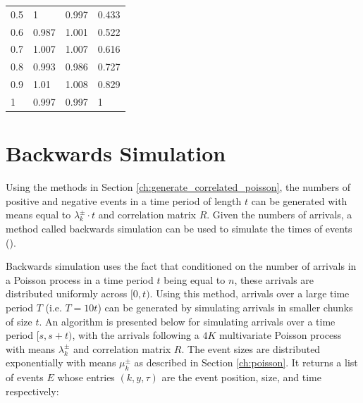 \begin{table}
\begin{tabular}{l|l|l|l}
0.5                 & 1                               & 0.997                           & 0.433               \\
0.6                 & 0.987                           & 1.001                           & 0.522               \\
0.7                 & 1.007                           & 1.007                           & 0.616               \\
0.8                 & 0.993                           & 0.986                           & 0.727               \\
0.9                 & 1.01                            & 1.008                           & 0.829               \\
1                   & 0.997                           & 0.997                           & 1                  
\end{tabular}
\end{table}

\section{Backwards Simulation} \label{ch:backwards_simulation}

Using the methods in Section \ref{ch:generate_correlated_poisson}, the numbers of positive and negative events in a time period of length $t$ can be generated with means equal to $\lambda^{\pm}_k \cdot t$ and correlation matrix $R$. Given the numbers of arrivals, a method called backwards simulation can be used to simulate the times of events (\cite{A7}). 

Backwards simulation uses the fact that conditioned on the number of arrivals in a Poisson process in a time period $t$ being equal to $n$, these arrivals are distributed uniformly across $[0,t)$. Using this method, arrivals over a large time period $T$ (i.e. $T = 10t$) can be generated by simulating arrivals in smaller chunks of size $t$. An algorithm is presented below for simulating arrivals over a time period $[s,s+t)$, with the arrivals following a $4K$ multivariate Poisson process with means $\lambda^{\pm}_k$ and correlation matrix $R$. The event sizes are distributed exponentially with means $\mu^{\pm}_k$ as described in Section \ref{ch:poisson}. It returns a list of events $E$ whose entries $(k,y,\tau)$ are the event position, size, and time respectively:
$$ $$

